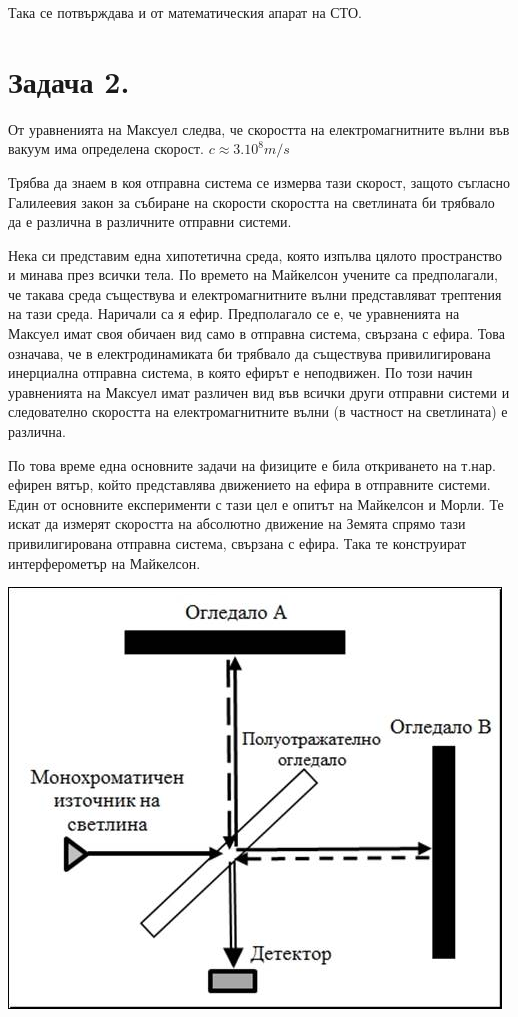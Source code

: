 \documentclass[a4paper,12pt]{article}
\begin{document}
Така се потвърждава и от математическия апарат на СТО.
\pagebreak
\section*{Задача 2.}
От уравненията на Максуел следва, че скоростта на електромагнитните 
вълни във вакуум има определена скорост.
$c \approx 3.10^{8}m/s$ 

Трябва да знаем в коя отправна система се измерва тази скорост, 
защото съгласно Галилеевия закон за събиране на скорости
скоростта на светлината би трябвало да е различна в различните отправни системи.

Нека си представим една хипотетична среда, която изпълва цялото пространство и минава през всички тела. 
По времето на Майкелсон учените са предполагали, че такава среда съществува и електромагнитните вълни 
представляват трептения на тази среда. Наричали са я ефир. Предполагало се е, че уравненията на Максуел имат 
своя обичаен вид само в отправна система, свързана с ефира.
Това означава, че в електродинамиката би трябвало да съществува привилигирована
инерциална отправна система, в която ефирът е неподвижен. 
По този начин уравненията на Максуел имат различен вид във всички други отправни системи
и следователно скоростта на електромагнитните вълни (в частност на светлината)
е различна.

По това време една основните задачи на физиците е била откриването на т.нар. 
ефирен вятър, който представлява движението на ефира в отправните системи.
Един от основните експерименти с тази цел е опитът на Майкелсон и Морли.
Те искат да измерят скоростта на абсолютно движение на Земята спрямо тази привилигирована отправна система, свързана 
с ефира. 
Така те конструират интерферометър на Майкелсон.
\begin{center}
    \includegraphics{image01.jpg}
\end{center}
\end{document}
